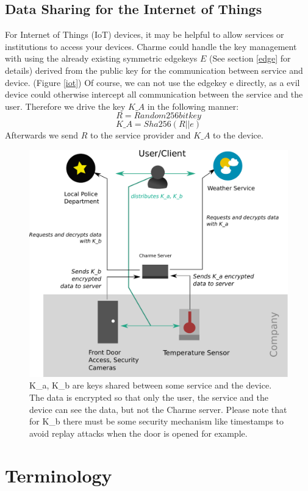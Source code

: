 \documentclass{scrartcl}
\begin{document}
  \subsection{Data Sharing for the Internet of Things}
  For Internet of Things (IoT) devices, it may be helpful to allow services or institutions to access your devices. Charme could handle the key management with using the already existing symmetric edgekeys $E$ (See section \ref{edge} for details) derived from the public key for the communication between service and device. (Figure \ref{iot})
Of course, we can not use the edgekey e directly, as a evil device could 
otherwise intercept all communication between the service and the user.
Therefore we drive the key $K\_A$ in the following manner:
$$
R = Random 256bit key
$$
$$
K\_A = Sha256(R || e)
$$
Afterwards we send $R$ to the service provider and $K\_A $ to the device.
\begin{figure}[ht]
	\centering
  \includegraphics[width=120mm]{illustrations/iot.pdf}
	\caption{K\_a, K\_b are keys shared between some service and the device. The data is encrypted so that only the user, the service and the device can see the data, but not the Charme server. Please note that for K\_b there must be some security mechanism  like timestamps to avoid replay attacks when the door is opened for example. \label{iot} }
	\label{figContext}
\end{figure}


\clearpage
\section{Terminology}
\end{document}
